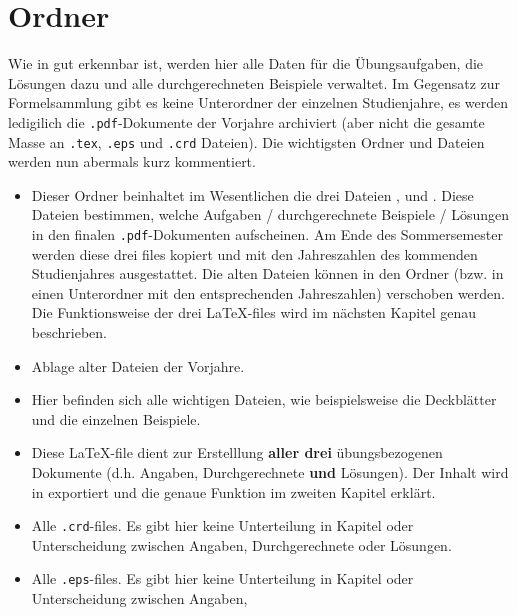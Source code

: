\section{Ordner }

Wie in  gut erkennbar ist, werden hier alle Daten für
die Übungsaufgaben, die Lösungen dazu und alle durchgerechneten Beispiele
verwaltet. Im Gegensatz zur Formelsammlung gibt es keine Unterordner der
einzelnen Studienjahre, es werden ledigilich die {\tt .pdf}-Dokumente der 
Vorjahre archiviert (aber nicht die gesamte Masse an {\tt .tex}, {\tt .eps} und 
{\tt .crd} Dateien). Die wichtigsten Ordner und Dateien werden nun abermals kurz
kommentiert.

\newpage
\begin{itemize}
  \item {} Dieser Ordner beinhaltet im
    Wesentlichen die drei Dateien ,
     und 
    . Diese Dateien bestimmen, welche
    Aufgaben / durchgerechnete Beispiele / Lösungen in den finalen
    {\tt .pdf}-Dokumenten aufscheinen. Am Ende des Sommersemester werden diese
    drei files kopiert und mit den Jahreszahlen des kommenden Studienjahres
    ausgestattet. Die alten Dateien können in den Ordner
     (bzw. in einen Unterordner mit den
    entsprechenden Jahreszahlen) verschoben werden. Die Funktionsweise der drei
    \LaTeX-files wird im nächsten Kapitel genau beschrieben.
  \item {} Ablage alter Dateien der Vorjahre.
  \item {} Hier befinden sich alle wichtigen Dateien, wie
    beispielsweise die Deckblätter und die einzelnen Beispiele.
  \item {} Diese \LaTeX-file dient zur Erstelllung
    {\bf aller drei} übungsbezogenen Dokumente (d.h. Angaben, Durchgerechnete
    {\bf und} Lösungen). Der Inhalt wird in  exportiert
    und die genaue Funktion im zweiten Kapitel erklärt.
  \item {} Alle {\tt .crd}-files. Es gibt hier keine
    Unterteilung in Kapitel oder Unterscheidung zwischen Angaben,
    Durchgerechnete oder Lösungen.
  \item {} Alle {\tt .eps}-files. Es gibt hier keine
    Unterteilung in Kapitel oder Unterscheidung zwischen Angaben,

\end{itemize}
